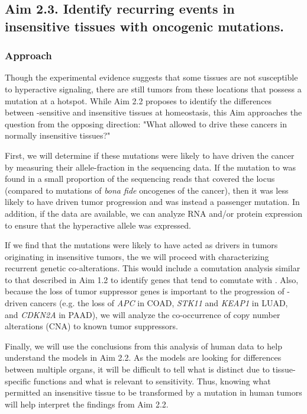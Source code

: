 
\subsection*{Aim 2.3. Identify recurring events in insensitive tissues with oncogenic \KRAS{} mutations.}

\subsubsection*{Approach}

Though the experimental evidence suggests that some tissues are not susceptible to hyperactive \kras{} signaling, there are still tumors from these locations that possess a mutation at a \KRAS{} hotspot.
While Aim 2.2 proposes to identify the differences between \KRAS{}-sensitive and insensitive tissues at homeostasis, this Aim approaches the question from the opposing direction: "What allowed \KRAS{} to drive these cancers in normally insensitive tissues?"

First, we will determine if these mutations were likely to have driven the cancer by measuring their allele-fraction in the sequencing data.
If the mutation to \KRAS{} was found in a small proportion of the sequencing reads that covered the \KRAS{} locus (compared to mutations of \emph{bona fide} oncogenes of the cancer), then it was less likely to have driven tumor progression and was instead a passenger mutation.
In addition, if the data are available, we can analyze RNA and/or protein expression to ensure that the hyperactive allele was expressed.

If we find that the \KRAS{} mutations were likely to have acted as drivers in tumors originating in insensitive tumors, the we will proceed with characterizing recurrent genetic co-alterations.
This would include a comutation analysis similar to that described in Aim 1.2 to identify genes that tend to comutate with \KRAS{}.
Also, because the loss of tumor suppressor genes is important to the progression of \KRAS{}-driven cancers (e.g. the loss of \emph{APC} in COAD, \emph{STK11} and \emph{KEAP1} in LUAD, and \emph{CDKN2A} in PAAD), we will analyze the co-occurrence of copy number alterations (CNA) to known tumor suppressors.

Finally, we will use the conclusions from this analysis of human data to help understand the models in Aim 2.2.
As the models are looking for differences between multiple organs, it will be difficult to tell what is distinct due to tissue-specific functions and what is relevant to \KRAS{} sensitivity.
Thus, knowing what permitted an insensitive tissue to be transformed by a \KRAS{} mutation in human tumors will help interpret the findings from Aim 2.2.

